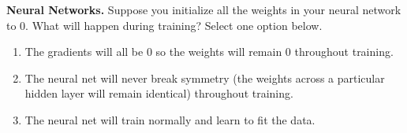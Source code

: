 \item{}
\textbf{Neural Networks.}
Suppose you initialize all the weights in your neural network to 0. What will happen during training? Select one option below.

\begin{enumerate}[label=(\alph*)]
    \item The gradients will all be 0 so the weights will remain 0 throughout training.
    \item The neural net will never break symmetry (the weights across a particular hidden layer will remain identical) throughout training.
    \item The neural net will train normally and learn to fit the data.
\end{enumerate} 
